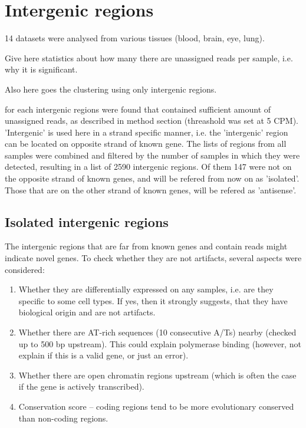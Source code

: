 \section{Intergenic regions}

14 datasets were analysed from various tissues (blood, brain, eye, lung).

Give here statistics about how many there are unassigned reads per sample, i.e. why it is significant.

Also here goes the clustering using only intergenic regions.

for each  intergenic regions were found that contained sufficient amount of unassigned reads,
as described in method section (threashold was set at 5 CPM).
'Intergenic' is used here in a strand specific manner, i.e. the 'intergenic' region can be located on opposite strand of known gene.
The lists of regions from all samples were combined and filtered by the number of samples in which they were detected,
resulting in a list of 2590 intergenic regions.
Of them 147 were not on the opposite strand of known genes, and will be refered from now on as 'isolated'.
Those that are on the other strand of known genes, will be refered as 'antisense'.

\subsection{Isolated intergenic regions}

The intergenic regions that are far from known genes and contain reads might indicate novel genes.
To check whether they are not artifacts, several aspects were considered:
\begin{enumerate}
  \item Whether they are differentially expressed on any samples, i.e. are they specific to some cell types.
  If yes, then it strongly suggests, that they have biological origin and are not artifacts.
  \item Whether there are AT-rich sequences (10 consecutive A/Ts) nearby (checked up to 500 bp upstream).
  This could explain polymerase binding (however, not explain if this is a valid gene, or just an error).
  \item Whether there are open chromatin regions upstream (which is often the case if the gene is actively transcribed).
  \item Conservation score – coding regions tend to be more evolutionary conserved than non-coding regions.
\end{enumerate}

